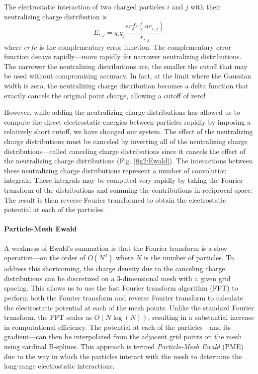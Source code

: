 The electrostatic interaction of two charged particles $i$ and $j$ with their
neutralizing charge distribution is 
\begin{equation*}
   E_{i,j} = q_i q_j \frac {erfc(\alpha r_{i,j})} {r_{i,j}}
\end{equation*}
where $erfc$ is the complementary error function. The complementary error
function decays rapidly---more rapidly for narrower neutralizing distributions.
The narrower the neutralizing distributions are, the smaller the cutoff that may
be used without compromising accuracy. In fact, at the limit where the Gaussian
width is zero, the neutralizing charge distribution becomes a delta function
that exactly cancels the original point charge, allowing a cutoff of zero!

However, while adding the neutralizing charge distributions has allowed us to
compute the direct electrostatic energies between particles rapidly by imposing
a relatively short cutoff, we have changed our system. The effect of the
neutralizing charge distributions must be canceled by inverting all of the
neutralizing charge distributions---called canceling charge distributions since
it cancels the effect of the neutralizing charge distributions (Fig.
\ref{fig2:Ewald}). The interactions between these neutralizing charge
distributions represent a number of convolution integrals. These integrals may
be computed very rapidly by taking the Fourier transform of the distributions
and summing the contributions in reciprocal space. The result is then
reverse-Fourier transformed to obtain the electrostatic potential at each of the
particles. \cite{Allen_Tildesley}

\paragraph{Particle-Mesh Ewald}

A weakness of Ewald's summation is that the Fourier transform is a slow
operation---on the order of $O(N^2)$ where $N$ is the number of particles. To
address this shortcoming, the charge density due to the canceling charge
distributions can be discretized on a 3-dimensional mesh with a given grid
spacing. This allows us to use the fast Fourier transform algorithm (FFT) to
perform both the Fourier transform and reverse Fourier transform to calculate
the electrostatic potential at each of the mesh points. Unlike the standard
Fourier transform, the FFT scales as $O(N\log(N))$, resulting in a substantial
increase in computational efficiency. The potential at each of the
particles---and its gradient---can then be interpolated from the adjacent grid
points on the mesh using cardinal B-splines. This approach is termed
\emph{Particle-Mesh Ewald} (PME) due to the way in which the particles interact
with the mesh to determine the long-range electrostatic interactions.

